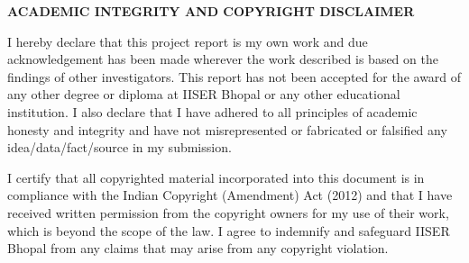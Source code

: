 \begin{center}
	{\textbf{\Large{ACADEMIC INTEGRITY AND COPYRIGHT DISCLAIMER}}}
\end{center}

\vspace{1.5em}

I hereby declare that this project report is my own work and due acknowledgement has been made wherever the work described is based on the findings of other investigators. This report has not been accepted for the award of any other degree or diploma at IISER Bhopal or any other educational institution. I also declare that I have adhered to all principles of academic honesty and integrity and have not misrepresented or fabricated or falsified any idea/data/fact/source in my submission. \\[1em]

\par I certify that all copyrighted material incorporated into this document is in compliance with the Indian Copyright (Amendment) Act (2012) and that I have received written permission from the copyright owners for my use of their work, which is beyond the scope of the law. I agree to indemnify and safeguard IISER Bhopal from any claims that may arise from any copyright violation.

\vspace{7em}

\parbox{0.7\textwidth}{
}
\hfill
\parbox{0.3\textwidth}{
	\mbox{\textbf{\mystudentname}}
}
